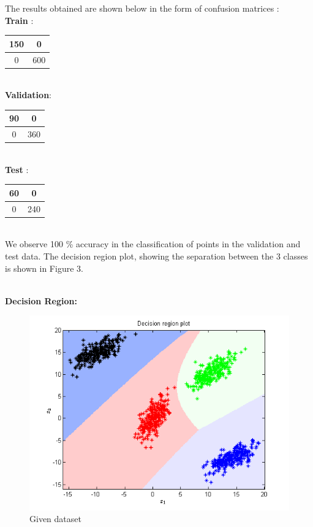 \documentclass{article}
\begin{document}
\begin{flushleft}
The results obtained are shown below in the form of confusion matrices :\\[10pt]

\textbf{Train} : \\[10pt]


\begin{tabular}{|c|c|}
\hline
150 & 0\\ 

\hline
0 & 600 \\ \hline

\end{tabular}\\[10pt]

\textbf{Validation}: \\[10pt]

\begin{tabular}{|c|c|} 
\hline
90 & 0\\ \hline
0 & 360 \\ \hline
\end{tabular}\\[10pt]

\textbf{Test} : \\[10pt]

\begin{tabular}{|c|c|} \hline 
60 & 0\\ \hline
0 & 240 \\ \hline 
 \end{tabular}\\[10pt]

We observe 100 \% accuracy in the classification of points in the validation and test data. The decision region plot, showing the separation between the 3 classes is shown in Figure 3.


\textbf{\\[10pt]Decision Region:\\[5pt]}


\begin{figure}[H]
\centering
\includegraphics[width=\linewidth]{Classification/linearlySeparable/decn_region_bayes.png}
\caption{Given dataset}
\end{figure}


\end{flushleft}
\end{document}
